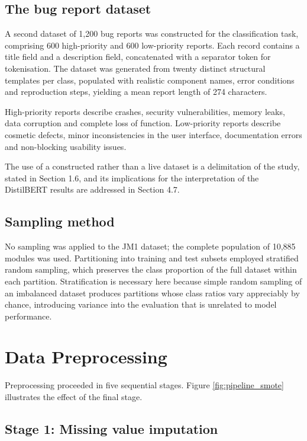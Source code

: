 \documentclass[12pt,a4paper,oneside]{report}
\begin{document}
\subsection{The bug report dataset}

A second dataset of 1,200 bug reports was constructed for the classification task, comprising 600 high-priority and 600 low-priority reports. Each record contains a title field and a description field, concatenated with a separator token for tokenisation. The dataset was generated from twenty distinct structural templates per class, populated with realistic component names, error conditions and reproduction steps, yielding a mean report length of 274 characters.

High-priority reports describe crashes, security vulnerabilities, memory leaks, data corruption and complete loss of function. Low-priority reports describe cosmetic defects, minor inconsistencies in the user interface, documentation errors and non-blocking usability issues.

The use of a constructed rather than a live dataset is a delimitation of the study, stated in Section 1.6, and its implications for the interpretation of the DistilBERT results are addressed in Section 4.7.

\subsection{Sampling method}

No sampling was applied to the JM1 dataset; the complete population of 10,885 modules was used. Partitioning into training and test subsets employed stratified random sampling, which preserves the class proportion of the full dataset within each partition. Stratification is necessary here because simple random sampling of an imbalanced dataset produces partitions whose class ratios vary appreciably by chance, introducing variance into the evaluation that is unrelated to model performance.

\section{Data Preprocessing}

Preprocessing proceeded in five sequential stages. Figure \ref{fig:pipeline_smote} illustrates the effect of the final stage.

\subsection{Stage 1: Missing value imputation}
\end{document}
